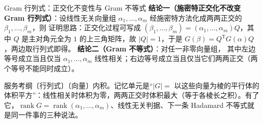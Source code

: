 \begin{fdeep}{Gram 行列式：正交化不变性与 Gram 不等式}
\textbf{结论一（施密特正交化不改变 Gram 行列式）}：设线性无关向量组 $\alpha_{1},\dots,\alpha_{m}$ 经施密特方法化成两两正交的 $\beta_{1},\dots,\beta_{m}$，则
证明思路：正交化过程可写成 $(\beta_{1},\dots,\beta_{m})=(\alpha_{1},\dots,\alpha_{m})Q$，其中 $Q$ 是主对角元全为 $1$ 的上三角矩阵，故 $|Q|=1$，于是 $G(\beta)=Q^{\mathrm T}G(\alpha)Q$，两边取行列式即得。
\textbf{结论二（Gram 不等式）}：对任一非零向量组，
其中左边等号成立当且仅当 $\alpha_{1},\dots,\alpha_{m}$ 线性相关；右边等号成立当且仅当它们两两正交（两个等号不能同时成立）。

\fbref{}服务考纲〔行列式〕〔向量〕内积。记忆单元是“$|G|=$ 以这些向量为棱的平行体的体积平方”：线性相关时体积为零，两两正交时体积最大（等于各棱长之积）。有了它，$\operatorname{rank}G=\operatorname{rank}(\alpha_{1},\dots,\alpha_{m})$、线性无关判据、下一条 Hadamard 不等式就是同一件事的三种说法。
\end{fdeep}
